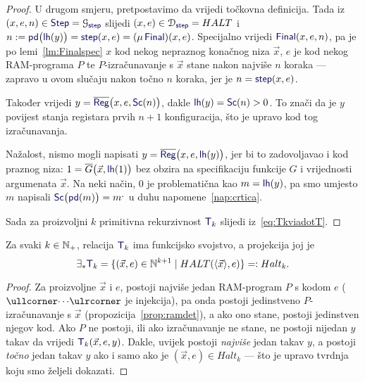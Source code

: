 \begin{proof}
U drugom smjeru, pretpostavimo da vrijedi točkovna definicija. Tada iz $(x,e,n)\in\f{Step}=\graf{\f{step}}$ slijedi $(x,e)\in\dom{\f{step}}=HALT$ i $n:=\f{pd}\bigl(\f{lh}(y)\bigr)=\f{step}(x,e)=(\mu\,\f{Final})(x,e)$. Specijalno vrijedi $\f{Final}(x,e,n)$, pa je po lemi~\ref{lm:Finalspec} $x$ kod nekog nepraznog konačnog niza $\vec x$, $e$ je kod nekog RAM-programa $P$ te $P$-izračunavanje s $\vec x$ stane nakon najviše $n$ koraka --- zapravo u ovom slučaju nakon točno $n$ koraka, jer je $n=\f{step}(x,e)$.

Također vrijedi $y=\overline{\f{Reg}}\bigl(x,e,\f{Sc}(n)\bigr)$, dakle $\f{lh}(y)=\f{Sc}(n)>0$. To znači da je $y$ povijest stanja registara prvih $n+1$ konfiguracija, što je upravo kod tog izračunavanja.

    Nažalost, nismo mogli napisati $y=\overline{\f{Reg}}\bigl(x,e,\f{lh}(y)\bigr)$, jer bi to zadovoljavao i kod praznog niza: $1=\overline G\bigl(\vec x,\f{lh}(1)\bigr)$ bez obzira na specifikaciju funkcije $G$ i vrijednosti argumenata $\vec x$. Na neki način, $0$ je problematična kao $m=\f{lh}(y)$, pa smo umjesto $m$ napisali $\f{Sc}\bigl(\f{pd}(m)\bigr)=m\bump$ u duhu napomene~\ref{nap:crtica}.

Sada za proizvoljni $k$ primitivna rekurzivnost $\f T_k$ slijedi iz~\eqref{eq:TkviadotT}.
\end{proof}

\begin{korolar}[{name=[funkcijsko svojstvo i projekcija Kleenejeve relacije]}]\label{kor:funHaltTk}
    Za svaki $k\in{\mathbb N}_+$, relacija $\f T_k$ ima funkcijsko svojstvo, a projekcija joj je 
    \begin{equation}
        \exists_*\f T_k=\{(\vec x,e)\in\N^{k+1}\mid HALT(\langle\vec x\rangle,e)\}=:Halt_k\text.
    \end{equation}
\end{korolar}
\begin{proof}
Za proizvoljne $\vec x$ i $e$, postoji najviše jedan RAM-program $P$ s kodom $e$ ($\kprog{\cdots}$ je injekcija), pa onda postoji jedinstveno $P$-izračunavanje s $\vec x$ (propozicija~\ref{prop:ramdet}), a ako ono stane, postoji jedinstven njegov kod. Ako $P$ ne postoji, ili ako izračunavanje ne stane, ne postoji nijedan $y$ takav da vrijedi $\f T_k(\vec x,e,y)$. Dakle, uvijek postoji \emph{najviše} jedan takav $y$, a postoji \emph{točno} jedan takav $y$ ako i samo ako je $(\vec x,e)\in Halt_k$ --- što je upravo tvrdnja koju smo željeli dokazati.
\end{proof}

